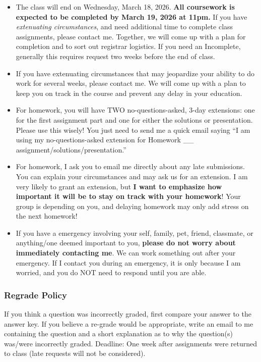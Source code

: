 \documentclass[
  letterpaper,
  DIV=11,
  numbers=noendperiod]{scrartcl}
\begin{document}
\begin{itemize}
\item
  The class will end on Wednesday, March 18, 2026. \textbf{All
  coursework is expected to be completed by March 19, 2026 at 11pm.} If
  you have \emph{extenuating circumstances}, and need additional time to
  complete class assignments, please contact me. Together, we will come
  up with a plan for completion and to sort out registrar logistics. If
  you need an Incomplete, generally this requires request two weeks
  before the end of class.
\item
  If you have extenuating circumstances that may jeopardize your ability
  to do work for several weeks, please contact me. We will come up with
  a plan to keep you on track in the course and prevent any delay in
  your education.
\item
  For homework, you will have TWO no-questions-asked, 3-day extensions:
  one for the first assignment part and one for either the solutions or
  presentation. Please use this wisely! You just need to send me a quick
  email saying ``I am using my no-questions-asked extension for Homework
  \_\_ assignment/solutions/presentation.''
\item
  For homework, I ask you to email me directly about any late
  submissions. You can explain your circumstances and may ask us for an
  extension. I am very likely to grant an extension, but \textbf{I want
  to emphasize how important it will be to stay on track with your
  homework}! Your group is depending on you, and delaying homework may
  only add stress on the next homework!
\item
  If you have a emergency involving your self, family, pet, friend,
  classmate, or anything/one deemed important to you, \textbf{please do
  not worry about immediately contacting me}. We can work something out
  after your emergency. If I contact you during an emergency, it is only
  because I am worried, and you do NOT need to respond until you are
  able.~
\end{itemize}

\subsubsection{Regrade Policy}\label{regrade-policy}

If you think a question was incorrectly graded, first compare your
answer to the answer key. If you believe a re-grade would be
appropriate, write an email to me containing the question and a short
explanation as to why the question(s) was/were incorrectly graded.
Deadline: One week after assignments were returned to class (late
requests will not be considered).
\end{document}
